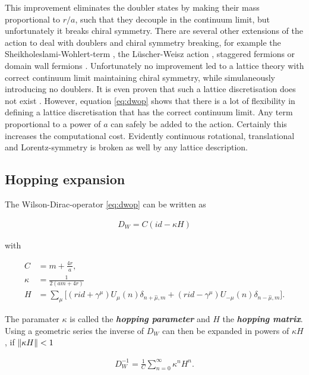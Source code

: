 \documentclass{article}
\theoremstyle{plain} %
\theoremstyle{convention} %
\theoremstyle{remark} %
\def\df#1{\textbf{\textit{#1}}}
\numberwithin{equation}{section}
\begin{document}
This improvement eliminates the doubler states by making their mass proportional to $r/a$, such that they decouple in the continuum limit, but unfortunately it breaks chiral symmetry. There are several other extensions of the action to deal with doublers and chiral symmetry breaking, for example the Sheikholeslami-Wohlert-term \cite{sheikholeslami1985}, the Lüscher-Weisz action \cite{luscher1985}, staggered fermions \cite{kogut1975} or domain wall fermions \cite{shamir1993}. Unfortunately no improvement led to a lattice theory with correct continuum limit maintaining chiral symmetry, while simulaneously introducing no doublers. It is even proven that such a lattice discretisation does not exist \cite{nielsen1981}. However, equation \eqref{eq:dwop} shows that there is a lot of flexibility in defining a lattice discretisation that has the correct continuum limit. Any term proportional to a power of $a$ can safely be added to the action. Certainly this increases the computational cost. Evidently continuous rotational, translational and Lorentz-symmetry is broken as well by any lattice description.

\subsection{Hopping expansion}

\label{sec:hopping_expansion}

The Wilson-Dirac-operator \eqref{eq:dwop} can be written as

\begin{align*}
    D_W = C ( id - \kappa H )
\end{align*}

with 

\begin{align*}
    C &= m + \frac{4r}{a}, \\
    \kappa &= \frac{1}{2(a m + 4r)} \\
    H &= \sum_{\mu} \Big[ (r id + \gamma^{\mu}) U_{\mu}(n) \delta_{n + \hat{\mu},m} + (r id - \gamma^{\mu}) U_{-\mu}(n) \delta_{n - \hat{\mu},m} \Big].
\end{align*}

The paramater $\kappa$ is called the \df{hopping parameter} and $H$ the \df{hopping matrix}. Using a geometric series the inverse of $D_W$ can then be expanded in powers of $\kappa H$, if $\norm{\kappa H} < 1$

\begin{align*}
    D_W^{-1} = \frac{1}{C} \sum_{n=0}^{\infty} \kappa^n H^n.
\end{align*}
\end{document}
